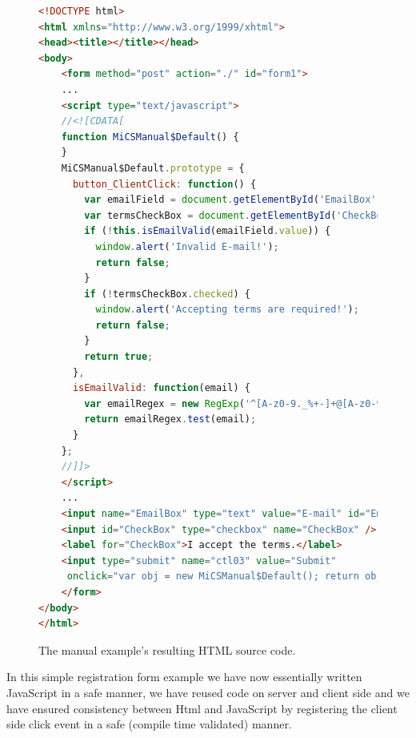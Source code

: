 \begin{figure}[H]
\begin{lstlisting}[language=html]
<!DOCTYPE html>
<html xmlns="http://www.w3.org/1999/xhtml">
<head><title></title></head>
<body>
    <form method="post" action="./" id="form1">
    ...
    <script type="text/javascript">
    //<![CDATA[
    function MiCSManual$Default() {
    }
    MiCSManual$Default.prototype = {
      button_ClientClick: function() {
        var emailField = document.getElementById('EmailBox');
        var termsCheckBox = document.getElementById('CheckBox');
        if (!this.isEmailValid(emailField.value)) {
          window.alert('Invalid E-mail!');
          return false;
        }
        if (!termsCheckBox.checked) {
          window.alert('Accepting terms are required!');
          return false;
        }
        return true;
      },
      isEmailValid: function(email) {
        var emailRegex = new RegExp('^[A-z0-9._%+-]+@[A-z0-9.-]+.[A-z]{2,4}$');
        return emailRegex.test(email);
      }
    };
    //]]>
    </script>
    ...
    <input name="EmailBox" type="text" value="E-mail" id="EmailBox" />
    <input id="CheckBox" type="checkbox" name="CheckBox" />
    <label for="CheckBox">I accept the terms.</label>
    <input type="submit" name="ctl03" value="Submit" 
     onclick="var obj = new MiCSManual$Default(); return obj.button_ClientClick();" />
    </form>
</body>
</html>
\end{lstlisting}
\caption{The manual example's resulting HTML source code.}
\label{fig:manualHtmlSource}
\end{figure}

In this simple registration form example we have now essentially written JavaScript in a safe manner, we have reused code on server and client side and we have ensured consistency between Html and JavaScript by registering the client side click event in a safe (compile time validated) manner.

